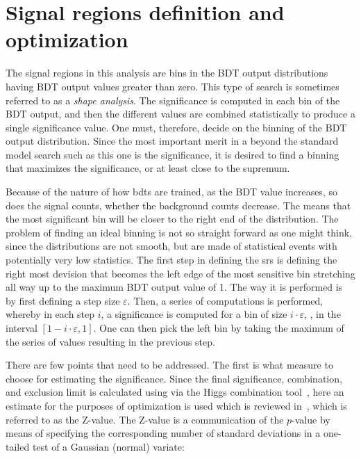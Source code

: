 \clearpage
\section{Signal regions definition and optimization}
\label{sec:signal-regions}

The signal regions in this analysis are bins in the BDT output distributions having BDT output values greater than zero. This type of search is sometimes referred to as a \emph{shape analysis}. The significance is computed in each bin of the BDT output, and then the different values are combined statistically to produce a single significance value. One must, therefore, decide on the binning of the BDT output distribution. Since the most important merit in a beyond the standard model search such as this one is the significance, it is desired to find a binning that maximizes the significance, or at least close to the supremum. 

Because of the nature of how \glspl{bdt} are trained, as the BDT value increases, so does the signal counts, whether the background counts decrease. The means that the most significant bin will be closer to the right end of the distribution. The problem of finding an ideal binning is not so straight forward as one might think, since the distributions are not smooth, but are made of statistical events with potentially very low statistics. The first step in defining the \glspl{sr} is defining the right most devision that becomes the left edge of the most sensitive bin stretching all way up to the maximum BDT output value of 1. The way it is performed is by first defining a step size $\varepsilon$. Then, a series of computations is performed, whereby in each step $i$, a significance is computed for a bin of size $i\cdot \varepsilon$, \ie, in the interval $\left[ 1-i\cdot \varepsilon, 1 \right]$. One can then pick the left bin by taking the maximum of the series of values resulting in the previous step.

There are few points that need to be addressed. The first is what measure to choose for estimating the significance. Since the final significance, combination, and exclusion limit is calculated using via the Higgs combination tool~\cite{higgs-combine-site}, here an estimate for the purposes of optimization is used which is reviewed in~\cite{pvalue,Cousins:2007bmb}, which is referred to as the Z-value. The Z-value is a communication of the $p$-value by means of specifying the corresponding number of standard deviations in a one-tailed test of a Gaussian (normal) variate:

